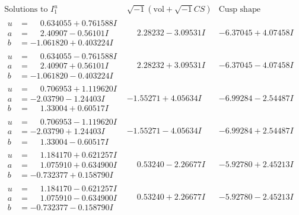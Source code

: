 \documentclass[1p]{elsarticle_modified}
\theoremstyle{definition}
\newcommand{\I}{\sqrt{-1}}
\begin{document}
$$\begin{array}{c|c|c}  
\text{Solutions to }I^u_{1}& \I (\text{vol} + \sqrt{-1}CS) & \text{Cusp shape}\\
 \hline 
\begin{aligned}
u &= \phantom{-}0.634055 + 0.761588 I \\
a &= \phantom{-}2.40907 - 0.56101 I \\
b &= -1.061820 + 0.403224 I\end{aligned}
 & \phantom{-}2.28232 - 3.09531 I & -6.37045 + 4.07458 I \\ \hline\begin{aligned}
u &= \phantom{-}0.634055 - 0.761588 I \\
a &= \phantom{-}2.40907 + 0.56101 I \\
b &= -1.061820 - 0.403224 I\end{aligned}
 & \phantom{-}2.28232 + 3.09531 I & -6.37045 - 4.07458 I \\ \hline\begin{aligned}
u &= \phantom{-}0.706953 + 1.119620 I \\
a &= -2.03790 - 1.24403 I \\
b &= \phantom{-}1.33004 + 0.60517 I\end{aligned}
 & -1.55271 + 4.05634 I & -6.99284 - 2.54487 I \\ \hline\begin{aligned}
u &= \phantom{-}0.706953 - 1.119620 I \\
a &= -2.03790 + 1.24403 I \\
b &= \phantom{-}1.33004 - 0.60517 I\end{aligned}
 & -1.55271 - 4.05634 I & -6.99284 + 2.54487 I \\ \hline\begin{aligned}
u &= \phantom{-}1.184170 + 0.621257 I \\
a &= \phantom{-}1.075910 + 0.634900 I \\
b &= -0.732377 + 0.158790 I\end{aligned}
 & \phantom{-}0.53240 - 2.26677 I & -5.92780 + 2.45213 I \\ \hline\begin{aligned}
u &= \phantom{-}1.184170 - 0.621257 I \\
a &= \phantom{-}1.075910 - 0.634900 I \\
b &= -0.732377 - 0.158790 I\end{aligned}
 & \phantom{-}0.53240 + 2.26677 I & -5.92780 - 2.45213 I \\ \hline\begin{aligned}

\end{aligned}
\end{array}$$
\end{document}
